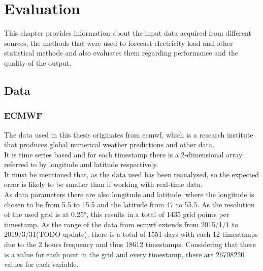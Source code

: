 \chapter{Evaluation}
\label{ch:Evaluation}

This chapter provides information about the input data acquired from different sources, the methods that were used to forecast electricity load and other statistical methods and also evaluates them regarding performance and the quality of the output.\\

\section{Data}
\label{sec:data}


\subsection{ECMWF}

The data used in this thesis originates from \acrshort{ecmwf}, which is a research institute that produces global numerical weather predictions and other data.\\
It is time series based and for each timestamp there is a 2-dimensional array referred to by longitude and latitude respectively.\\

It must be mentioned that, as the data used has been reanalysed, so the expected error is likely to be smaller than if working with real-time data.\\

As data parameters there are also longitude and latitude, where the longitude is chosen to be from 5.5 to 15.5 and the latitude from 47 to 55.5. As the resolution of the used grid is at 0.25°, this results in a total of 1435 grid points per timestamp. As the range of the data from \acrshort{ecmwf} extends from 2015/1/1 to 2019/3/31(TODO update), there is a total of 1551 days with each 12 timestamps due to the 2 hours frequency and thus 18612 timestamps. Considering that there is a value for each point in the grid and every timestamp, there are 26708220 values for each variable.\\

